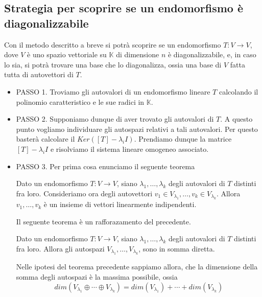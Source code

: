 
\subsection{Strategia per scoprire se un endomorfismo \`e diagonalizzabile}
Con il metodo descritto a breve si potr\`a scoprire se un endomorfismo
$T : V \to V$, dove $V$ \`e uno spazio vettoriale su $\mathbb{K}$ di dimensione $n$
\`e diagonalizzabile, e, in caso lo sia, si potr\`a trovare una base che lo diagonalizza,
ossia una base di $V$ fatta tutta di autovettori di $T$.

\begin{itemize}
	\item PASSO 1. Troviamo gli autovalori di un endomorfismo lineare $T$ calcolando il polinomio
	      caratteristico e le sue radici in $\mathbb{K}$.
	\item PASSO 2. Supponiamo dunque di aver trovato gli autovalori di $T$. A questo punto
	      vogliamo individuare gli autospazi relativi a tali autovalori.
	      Per questo baster\`a calcolare il $Ker([T] - \lambda_i I)$. Prendiamo dunque la
	      matrice $[T] - \lambda_i I$ e risolviamo il sistema lineare omogeneo associato.
	\item PASSO 3. Per prima cosa enunciamo il seguente teorema
	      \begin{theorem}
		      Dato un endomorfismo $T : V \to V$, siano $\lambda_1, \dots, \lambda_k$
		      degli autovalori di $T$ distinti fra loro. Consideriamo ora degli autovettori
		      $v_1 \in V_{\lambda_1}, \dots, v_k \in V_{\lambda_k}$. Allora
		      $v_1, \dots, v_k$ \`e un insieme di vettori linearmente indipendenti.
	      \end{theorem}
	      
	      Il seguente teorema \`e un rafforazamento del precedente.
	      \begin{theorem}
		      Dato un endomorfismo $T : V \to V$, siano $\lambda_1, \dots, \lambda_k$ degli
		      autovalori di $T$ distinti fra loro. Allora gli autospazi
		      $V_{\lambda_1}, \dots, V_{\lambda_k}$, sono in somma diretta.
	      \end{theorem}
	      
	      Nelle ipotesi del teorema precedente sappiamo allora, che la dimensione della somma
	      degli autospazi \`e la massima possibile, ossia
	      \begin{equation*}
		      dim(V_{\lambda_1} \oplus \cdots \oplus V_{\lambda_k}) = dim(V_{\lambda_1}) +
		      \cdots + dim(V_{\lambda_k})
	      \end{equation*}
	      

\end{itemize}
